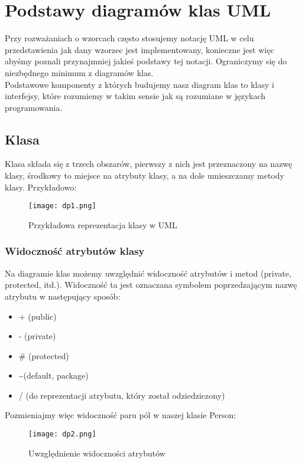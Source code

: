 \documentclass[a4paper,15pt]{article}
\begin{document}
\newpage
\section{Podstawy diagramów klas UML}
Przy rozważaniach o wzorcach często stosujemy notację UML w celu przedstawienia jak dany wzorzec jest implementowany, konieczne jest więc abyśmy poznali przynajmniej jakieś podstawy tej notacji. Ograniczymy się do niezbędnego minimum z diagramów klas. \\


Podstawowe komponenty z których budujemy nasz diagram klas to klasy i interfejsy, które rozumiemy w takim sensie jak są rozumiane w językach programowania.

\subsection{Klasa}
Klasa składa się z trzech obszarów, pierwszy z nich jest przeznaczony na nazwę klasy, środkowy to miejsce na atrybuty klasy, a na dole umieszczamy metody klasy. Przykładowo:

\begin{figure}[H]
\centering
  \texttt{[image: dp1.png]}
  \caption{Przykładowa reprezentacja klasy w UML}
\end{figure}

\subsubsection{Widoczność atrybutów klasy}

Na diagramie klas możemy uwzględnić widoczność atrybutów i metod (private, protected, itd.). Widoczność ta jest oznaczana symbolem poprzedzającym nazwę atrybutu w następujący sposób:
\begin{itemize}
\item + (public)
\item - (private)
\item \# (protected)
\item \textasciitilde (default, package)
\item / (do reprezentacji atrybutu, który został odziedziczony)
\end{itemize} 

Pozmieniajmy więc widoczność paru pól w naszej klasie Person:

\begin{figure}[H]
\centering
  \texttt{[image: dp2.png]}
  \caption{Uwzględnienie widoczności atrybutów}
\end{figure}
\end{document}
